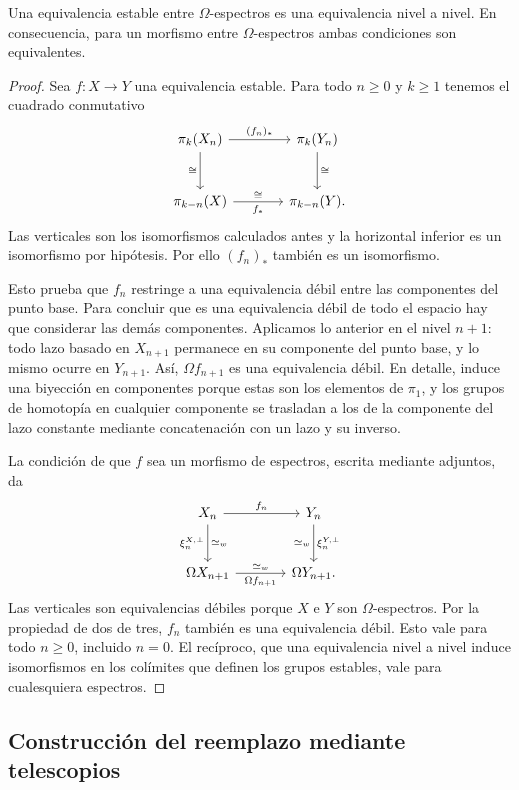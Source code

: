 \begin{prop}\label{prop:c10-omega-equivalencias}
Una equivalencia estable entre $\Omega$-espectros es una equivalencia nivel a nivel. En consecuencia, para un morfismo entre $\Omega$-espectros ambas condiciones son equivalentes.
\end{prop}
\begin{proof}
Sea $f\colon X\to Y$ una equivalencia estable. Para todo $n\ge0$ y $k\ge1$ tenemos el cuadrado conmutativo
\[
\begin{tikzcd}[column sep=large,row sep=large]
\pi_k(X_n) \arrow[r,"(f_n)_*"] \arrow[d,"\cong"']
& \pi_k(Y_n) \arrow[d,"\cong"]\\
\pi_{k-n}(X) \arrow[r,"f_*"',"\cong"]
& \pi_{k-n}(Y).
\end{tikzcd}
\]
Las verticales son los isomorfismos calculados antes y la horizontal inferior es un isomorfismo por hipótesis. Por ello $(f_n)_*$ también es un isomorfismo.

Esto prueba que $f_n$ restringe a una equivalencia débil entre las componentes del punto base. Para concluir que es una equivalencia débil de todo el espacio hay que considerar las demás componentes. Aplicamos lo anterior en el nivel $n+1$: todo lazo basado en $X_{n+1}$ permanece en su componente del punto base, y lo mismo ocurre en $Y_{n+1}$. Así, $\Omega f_{n+1}$ es una equivalencia débil. En detalle, induce una biyección en componentes porque estas son los elementos de $\pi_1$, y los grupos de homotopía en cualquier componente se trasladan a los de la componente del lazo constante mediante concatenación con un lazo y su inverso.

La condición de que $f$ sea un morfismo de espectros, escrita mediante adjuntos, da
\[
\begin{tikzcd}[column sep=large,row sep=large]
X_n \arrow[r,"f_n"] \arrow[d,"\xi_n^{X,\perp}"',"\simeq_w"]
& Y_n \arrow[d,"\xi_n^{Y,\perp}","\simeq_w"']\\
\Omega X_{n+1} \arrow[r,"\Omega f_{n+1}"',"\simeq_w"]
& \Omega Y_{n+1}.
\end{tikzcd}
\]
Las verticales son equivalencias débiles porque $X$ e $Y$ son $\Omega$-espectros. Por la propiedad de dos de tres, $f_n$ también es una equivalencia débil. Esto vale para todo $n\ge0$, incluido $n=0$. El recíproco, que una equivalencia nivel a nivel induce isomorfismos en los colímites que definen los grupos estables, vale para cualesquiera espectros.
\end{proof}

\subsection{Construcción del reemplazo mediante telescopios}

